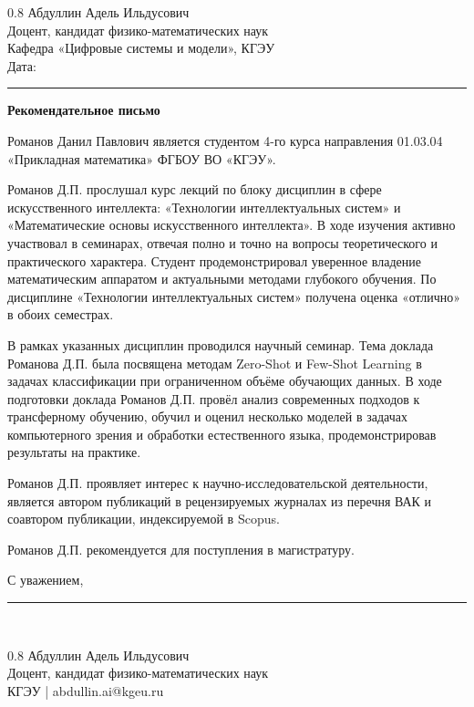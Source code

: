 \documentclass[a4paper,14pt]{extarticle}
\begin{document}
\begin{flushright}
  \begin{spacing}{0.8}
    Абдуллин Адель Ильдусович\\
    Доцент, кандидат физико-математических наук\\
    Кафедра «Цифровые системы и модели», КГЭУ\\[6pt]
    Дата: \rule{4cm}{0.4pt}
  \end{spacing}
\end{flushright}

\begin{center}
  {\Large\bfseries Рекомендательное письмо}
\end{center}

Романов Данил Павлович является студентом 4-го курса направления 01.03.04 «Прикладная математика» ФГБОУ ВО «КГЭУ».

Романов Д.П. прослушал курс лекций по блоку дисциплин в сфере искусственного интеллекта: «Технологии интеллектуальных систем» и «Математические основы искусственного интеллекта». В ходе изучения активно участвовал в семинарах, отвечая полно и точно на вопросы теоретического и практического характера. Студент продемонстрировал уверенное владение математическим аппаратом и актуальными методами глубокого обучения. По дисциплине «Технологии интеллектуальных систем» получена оценка «отлично» в обоих семестрах.

В рамках указанных дисциплин проводился научный семинар. Тема доклада Романова Д.П. была посвящена методам Zero-Shot и Few-Shot Learning в задачах классификации при ограниченном объёме обучающих данных. В ходе подготовки доклада Романов Д.П. провёл анализ современных подходов к трансферному обучению, обучил и оценил несколько моделей в задачах компьютерного зрения и обработки естественного языка, продемонстрировав результаты на практике.

Романов Д.П. проявляет интерес к научно-исследовательской деятельности, является автором публикаций в рецензируемых журналах из перечня ВАК и соавтором публикации, индексируемой в Scopus.

Романов Д.П. рекомендуется для поступления в магистратуру.

\vspace{10pt}
\noindent С уважением,

\vspace{15pt}
\rule{5cm}{0.4pt}\\[4pt]
\begin{spacing}{0.8}
  {Абдуллин Адель Ильдусович}\\
  {\small Доцент, кандидат физико-математических наук}\\
  {\small КГЭУ | abdullin.ai@kgeu.ru}
\end{spacing}
\end{document}
